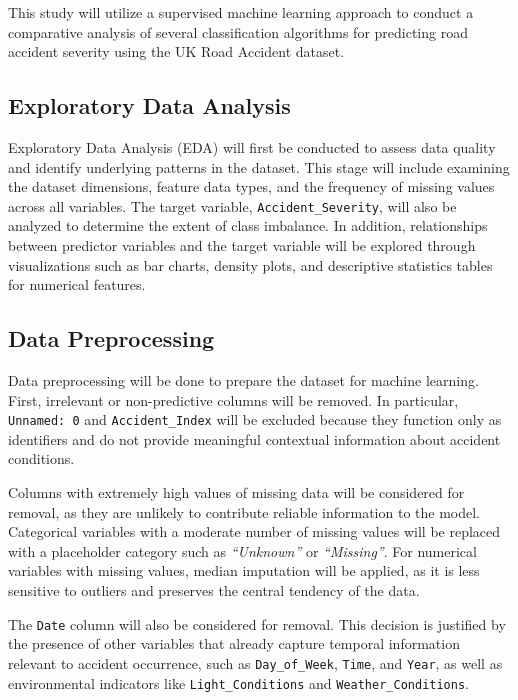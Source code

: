 This study will utilize a supervised machine learning approach to conduct a comparative analysis of several classification algorithms for predicting road accident severity using the UK Road Accident dataset.

\subsection{Exploratory Data Analysis}

Exploratory Data Analysis (EDA) will first be conducted to assess data quality and identify underlying patterns in the dataset. This stage will include examining the dataset dimensions, feature data types, and the frequency of missing values across all variables. The target variable, \texttt{Accident\_Severity}, will also be analyzed to determine the extent of class imbalance. In addition, relationships between predictor variables and the target variable will be explored through visualizations such as bar charts, density plots, and descriptive statistics tables for numerical features.

\subsection{Data Preprocessing}

Data preprocessing will be done to prepare the dataset for machine learning. First, irrelevant or non-predictive columns will be removed. In particular, \texttt{Unnamed: 0} and \texttt{Accident\_Index} will be excluded because they function only as identifiers and do not provide meaningful contextual information about accident conditions.

Columns with extremely high values of missing data will be considered for removal, as they are unlikely to contribute reliable information to the model. Categorical variables with a moderate number of missing values will be replaced with a placeholder category such as \textit{``Unknown''} or \textit{``Missing''}. For numerical variables with missing values, median imputation will be applied, as it is less sensitive to outliers and preserves the central tendency of the data.

The \texttt{Date} column will also be considered for removal. This decision is justified by the presence of other variables that already capture temporal information relevant to accident occurrence, such as \texttt{Day\_of\_Week}, \texttt{Time}, and \texttt{Year}, as well as environmental indicators like \texttt{Light\_Conditions} and \texttt{Weather\_Conditions}.

